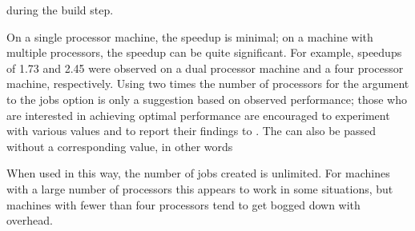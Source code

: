 \begin{itemize}
during the build step.

On a single processor machine, the speedup is minimal; on a machine with 
multiple processors, the speedup can be quite significant.  For example, 
speedups of 1.73 and 2.45 were observed on a dual processor machine and a four 
processor machine, respectively.  Using two times the number of processors for 
the argument to the jobs option is only a suggestion based on observed 
performance; those who are interested in achieving optimal performance are
encouraged to experiment with various values and to report 
their findings to .  The 
 can also be passed without a corresponding value, in other 
words


When used in this way, the number of jobs created is unlimited.  For machines 
with a large number of processors this appears to work in some situations, but
machines with fewer than four processors tend to get bogged down with 
overhead.

\end{itemize}


